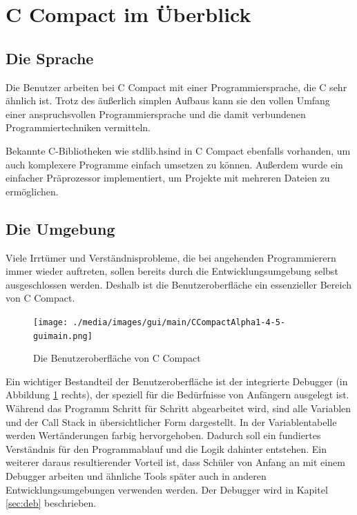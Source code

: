 \section{C Compact im Überblick}

\subsection*{Die Sprache}
Die Benutzer arbeiten bei C Compact mit einer Programmiersprache, die C sehr ähnlich ist. Trotz des äußerlich simplen Aufbaus kann sie den vollen Umfang einer anspruchsvollen Programmiersprache und die damit verbundenen Programmiertechniken vermitteln.

Bekannte C-Bibliotheken wie \glqq{}stdlib.h\grqq{}sind in C Compact ebenfalls vorhanden, um auch komplexere Programme einfach umsetzen zu können. Außerdem wurde ein einfacher Präprozessor implementiert, um Projekte mit mehreren Dateien zu ermöglichen.

\subsection*{Die Umgebung}
Viele Irrtümer und Verständnisprobleme, die bei angehenden Programmierern immer wieder auftreten, sollen bereits durch die Entwicklungsumgebung selbst ausgeschlossen werden. Deshalb ist die Benutzeroberfläche ein essenzieller Bereich von C Compact. %


\begin{figure}[h!]
	\centering
	\texttt{[image: ./media/images/gui/main/CCompactAlpha1-4-5-guimain.png]}
	\caption{Die Benutzeroberfläche von C Compact}
	\label{fig:intro-over-gui}
\end{figure}

Ein wichtiger Bestandteil der Benutzeroberfläche ist der integrierte Debugger (in Abbildung \ref{fig:intro-over-gui} rechts), der speziell für die Bedürfnisse von Anfängern ausgelegt ist. Während das Programm Schritt für Schritt abgearbeitet wird, sind alle Variablen und der Call Stack in übersichtlicher Form dargestellt. In der Variablentabelle werden Wertänderungen farbig hervorgehoben. Dadurch soll ein fundiertes Verständnis für den Programmablauf und die Logik dahinter entstehen.
Ein weiterer daraus resultierender Vorteil ist, dass Schüler von Anfang an mit einem Debugger arbeiten und ähnliche Tools später auch in anderen Entwicklungsumgebungen verwenden werden. Der Debugger wird in Kapitel \ref{sec:deb} beschrieben.


